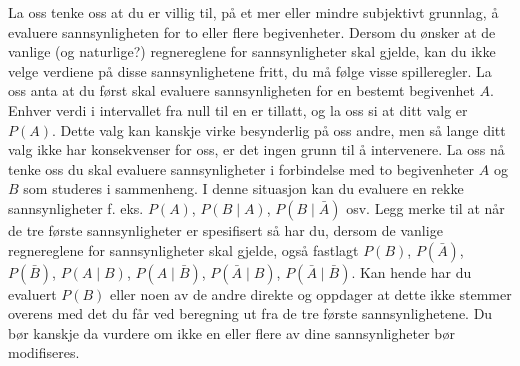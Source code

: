 La oss tenke oss at du er villig til, på et mer eller
mindre subjektivt grunnlag, å evaluere sannsynligheten for to
eller flere begivenheter. Dersom du ønsker at de vanlige (og
naturlige?) regnereglene for sannsynligheter skal gjelde, kan du
ikke velge verdiene på disse sannsynlighetene fritt, du må følge
visse spilleregler. La oss anta at du først skal evaluere
sannsynligheten for en bestemt begivenhet $A$. Enhver verdi i
intervallet fra null til en er tillatt, og la oss si at ditt valg
er $P(A)$. Dette valg kan kanskje virke besynderlig på oss andre,
men så lange ditt valg ikke har konsekvenser for oss, er det
ingen grunn til å intervenere. La oss nå tenke oss du skal
evaluere sannsynligheter i forbindelse med to begivenheter $A$ og
$B$ som studeres i sammenheng. I denne situasjon kan du evaluere
en rekke sannsynligheter f. eks. $P(A)$, $P(B\mid A)$, $P(B\mid \bar{A} )$
osv. Legg merke til at når de tre første sannsynligheter er
spesifisert så har du, dersom de vanlige regnereglene for
sannsynligheter skal gjelde, også fastlagt
 $P(B)$, $P(\bar{A})$, $P(\bar{B})$, $P(A \mid B)$, $P(A \mid \bar{B} )$,
 $P(\bar{A} \mid B )$,  $P(\bar{A} \mid \bar{B})$. 
Kan hende har du evaluert $P(B)$ eller noen av de andre direkte
og oppdager at dette ikke stemmer overens med det du får ved
beregning ut fra de tre første sannsynlighetene. Du bør kanskje
da vurdere om ikke en eller flere av dine sannsynligheter bør
modifiseres.\\

